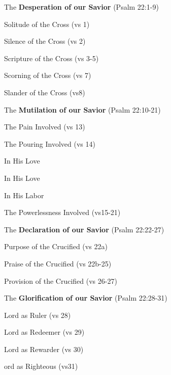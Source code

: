 \begin{compactenum}[I.][19]
    \item The \textbf{Desperation of our Savior}  (Psalm 22:1-9)
    \begin{compactenum}[A.]
		\item Solitude of the Cross (vs 1)
		\item Silence of the Cross (vs 2)
		\item Scripture of the Cross (vs 3-5)
		\item Scorning of the Cross (vs 7)
		\item Slander of the Cross (vs8)
	\end{compactenum}
    \item The \textbf{Mutilation of our Savior}  (Psalm 22:10-21)
    \begin{compactenum}[A.]
		\item The Pain Involved (vs 13)
		\item The Pouring Involved (vs 14)
		\begin{compactenum}[i.]
			\item In His Love
			\item In His Love
			\item In His Labor
		\end{compactenum}
		\item The Powerlessness Involved (vs15-21)
	\end{compactenum}
    \item The \textbf{Declaration of our Savior}  (Psalm 22:22-27)
    \begin{compactenum}[A.]
		\item Purpose of the Crucified (vs 22a)
		\item Praise of the Crucified (vs 22b-25)
		\item Provision of the Crucified (vs 26-27)
	\end{compactenum}
    \item The \textbf{Glorification of our Savior}  (Psalm 22:28-31)
    \begin{compactenum}[A.]
		\item Lord as Ruler (vs 28)
		\item Lord as Redeemer (vs 29)
		\item Lord as Rewarder (vs 30)
		\item ord as Righteous (vs31)
	\end{compactenum}
\end{compactenum}


